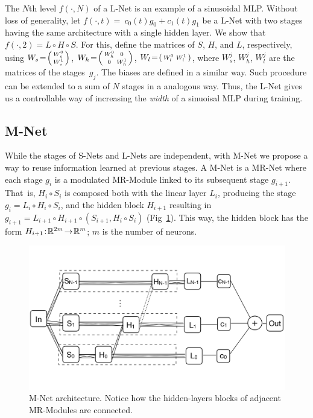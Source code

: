 The $N$th level $f(\cdot, N)$ of a L-Net is an example of a sinusoidal MLP.
Without loss of generality, let $f(\cdot, t)=~c_0(t)g_0+c_1(t)g_1$ be a L-Net with two stages having the same architecture with a single hidden layer. We show that $f(\cdot, 2)\!=\!L\!\circ\! H\!\circ\! S$.
For this, define the matrices of $S$, $H$, and $L$, respectively, using $W_s\!=\!\begin{psmallmatrix}W_s^0\\W_s^1\end{psmallmatrix}$, 
$W_h\!=\!\begin{psmallmatrix}W_h^0& 0\\0&W_h^1\end{psmallmatrix}$, 
$W_l\!=\!\begin{psmallmatrix}W_l^0 & W_l^1\end{psmallmatrix}$, where $W_s^j$, $W_h^j$, $W_l^j$ are the matrices of the stages~$g_j$. The biases are defined in a similar way. Such procedure can be extended to a sum of $N$ stages in a analogous way.
Thus, the L-Net gives us a controllable way of increasing the \textit{width} of a sinuoisal MLP during training.


\subsection{M-Net}
\label{s-mnet}
While the stages of S-Nets and L-Nets are independent, with M-Net we propose a way to reuse information learned at previous stages.
A M-Net is a MR-Net where each stage $g_i$ is a modulated MR-Module linked to its subsequent stage $g_{i+1}$.
That~is, $H_i\circ  S_i$ is composed both with the linear layer $L_i$, producing the stage $g_i\! =\! L_i\!\circ\! H_i\!\circ\!  S_i$, and the hidden block $H_{i+1}$ resulting in $g_{i+1}\! =\! L_{i+1}\!\circ H_{i+1}\!\circ\left(S_{i+1}, H_i\circ  S_i\right)$ (Fig~\ref{f:m-net}).
This way, the hidden block has the form $H_{i+1}\!:\!\mathbb{R}^{2m}\!\to\! \mathbb{R}^m$; $m$ is the number of neurons.
\begin{figure}[!h]
\centering
\includegraphics[width=0.75\linewidth]{img/ch4/mnet.pdf}
\caption{M-Net architecture. Notice how the hidden-layers blocks of adjacent MR-Modules are connected.}
\label{f:m-net}
\end{figure}

